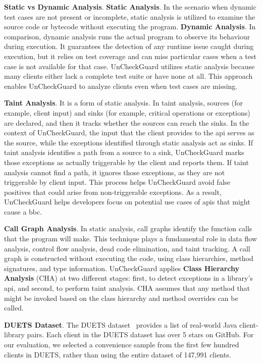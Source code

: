\textbf{Static vs Dynamic Analysis}. \textbf{Static Analysis}. In the scenario when dynamic test cases are not present or incomplete, static analysis is utilized to examine the source code or bytecode without executing the program. \textbf{Dynamic Analysis}. In comparison, dynamic analysis runs the actual program to observe its behaviour during execution. It guarantees the detection of any runtime issue caught during execution, but it relies on test coverage and can miss particular cases when a test case is not available for that case. UnCheckGuard utilizes static analysis because many clients either lack a complete test suite or have none at all. This approach enables UnCheckGuard to analyze clients even when test cases are missing.

\textbf{Taint Analysis}. It is a form of static analysis. In taint analysis, sources (for example, client input) and sinks (for example, critical operations or exceptions) are declared, and then it tracks whether the sources can reach the sinks. In the context of UnCheckGuard, the input that the client provides to the \gls{api} serves as the source, while the exceptions identified through static analysis act as sinks.  If taint analysis identifies a path from a source to a sink, UnCheckGuard marks those exceptions as actually triggerable by the client and reports them.  If taint analysis cannot find a path, it ignores those exceptions, as they are not triggerable by client input.  This process helps UnCheckGuard avoid false positives that could arise from non-triggerable exceptions.  As a result, UnCheckGuard helps developers focus on potential use cases of \gls{api}s that might cause a \gls{bbc}.

\textbf{Call Graph Analysis}. In static analysis, call graphs identify the function calls that the program will make. This technique plays a fundamental role in data flow analysis, control flow analysis, dead code elimination, and taint tracking. A call graph is constructed without executing the code, using class hierarchies, method signatures, and type information. UnCheckGuard applies \textbf{Class Hierarchy Analysis} (CHA) at two different stages: first, to detect exceptions in a library’s \gls{api}, and second, to perform taint analysis. CHA assumes that any method that might be invoked based on the class hierarchy and method overrides can be called.

\textbf{DUETS Dataset}. The DUETS dataset~\cite{durieux21:_duets} provides a list of real-world Java client-library pairs. Each client in the DUETS dataset has over 5 stars on GitHub. For our evaluation, we selected a convenience sample from the first few hundred clients in DUETS, rather than using the entire dataset of 147,991 clients.